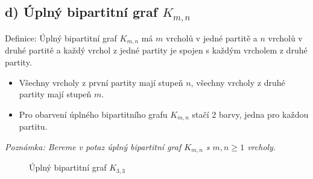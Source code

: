 \documentclass[10pt, a4paper]{ReportSheet}
\begin{document}
\begin{uloha}{1}{2}

        \subsection{d) Úplný bipartitní graf $K_{m,n}$}
        \label{subsec:ukol-2-1d-uplny-bipartitni-graf}
        Definice: Úplný bipartitní graf $K_{m,n}$ má $m$ vrcholů v jedné partitě a $n$ vrcholů v druhé partitě a každý vrchol z jedné partity je spojen s každým vrcholem z druhé partity.

        \begin{itemize}
            \item Všechny vrcholy z první partity mají stupeň $n$, všechny vrcholy z druhé partity mají stupeň $m$.
            \item Pro obarvení úplného bipartitního grafu $K_{m,n}$ stačí 2 barvy, jedna pro každou partitu.
        \end{itemize}
        \textit{Poznámka: Bereme v potaz úplný bipartitní graf $K_{m,n}$ s $m,n \geq 1$ vrcholy.}

        \begin{figure}[H]
            \centering
            \caption{Úplný bipartitní graf $K_{3,3}$}
            \label{fig:ukol-2-1d-uplny-bipartitni-graf}
        \end{figure}


\end{uloha}
\end{document}
